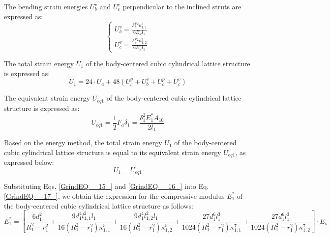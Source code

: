 \documentclass{article} %
\begin{document}
The bending strain energies $U_{b}^{v} $ and $U_{c}^{v} $ perpendicular to the inclined struts are expressed as:
\begin{equation} \label{GrindEQ__14_} 
\left\{\begin{array}{l} {U_{b}^{v} =\frac{F_{b}^{v} {}^{2} \kappa _{1,1}^{3} }{6E_{s} I_{1} } } \\ {U_{c}^{v} =\frac{F_{c}^{v} {}^{2} \kappa _{1,2}^{3} }{6E_{s} I_{1} } } \end{array}\right.  
\end{equation} 

The total strain energy $U_{1} $ of the body-centered cubic cylindrical lattice structure is expressed as:
\begin{equation} \label{GrindEQ__15_} 
U_{1} =24\cdot U_{a} +48\left(U_{b}^{p} +U_{b}^{v} +U_{c}^{p} +U_{c}^{v} \right) 
\end{equation} 

The equivalent strain energy $U_{eq1} $ of the body-centered cubic cylindrical lattice structure is expressed as:
\begin{equation} \label{GrindEQ__16_} 
U_{eq1} =\frac{1}{2} F_{a} \delta _{1} =\frac{\delta _{1}^{2} E_{1}^{*} A_{10} }{2l_{1} }  
\end{equation} 

Based on the energy method, the total strain energy $U_{1} $ of the body-centered cubic cylindrical lattice structure is equal to its equivalent strain energy $U_{eq1} $, as expressed below:
\begin{equation} \label{GrindEQ__17_} 
U_{1} =U_{eq1}  
\end{equation} 

Substituting Eqs. \eqref{GrindEQ__15_} and \eqref{GrindEQ__16_} into Eq. \eqref{GrindEQ__17_}, we obtain the expression for the compressive modulus $E_{1}^{*} $ of the body-centered cubic cylindrical lattice structure as follows:
\begin{equation} \label{GrindEQ__18_} 
E_{1}^{*} =\left[\frac{6d_{1}^{2} }{R_{1}^{2} -r_{1}^{2} } +\frac{9d_{1}^{4} l_{1,1}^{2} l_{1} }{16\left(R_{1}^{2} -r_{1}^{2} \right)\kappa _{1,1}^{5} } +\frac{9d_{1}^{4} l_{1,2}^{2} l_{1} }{16\left(R_{1}^{2} -r_{1}^{2} \right)\kappa _{1,2}^{5} } +\frac{27d_{1}^{6} l_{1}^{3} }{1024\left(R_{1}^{2} -r_{1}^{2} \right)\kappa _{1,1}^{7} } +\frac{27d_{1}^{6} l_{1}^{3} }{1024\left(R_{1}^{2} -r_{1}^{2} \right)\kappa _{1,2}^{7} } \right]\cdot E_{s}  
\end{equation} 
\end{document}
